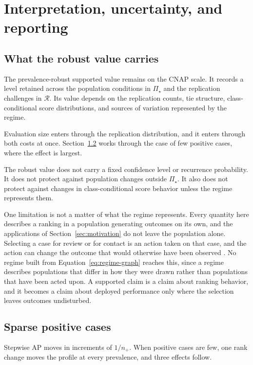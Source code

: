 \documentclass[11pt]{article}
\newcommand{\Regime}{\mathcal{R}}
\newcommand{\PSet}{\Pi_\star}
\theoremstyle{remark}
\begin{document}
\section{Interpretation, uncertainty, and reporting}
\label{sec:reporting}

\subsection{What the robust value carries}

The prevalence-robust supported value remains on the CNAP scale. It records a level retained across the population conditions in $\PSet$ and the replication challenges in $\Regime$. Its value depends on the replication counts, tie structure, class-conditional score distributions, and sources of variation represented by the regime.

Evaluation size enters through the replication distribution, and it enters through both costs at once. Section~\ref{sec:sparse} works through the case of few positive cases, where the effect is largest.

The robust value does not carry a fixed confidence level or recurrence probability. It does not protect against population changes outside $\PSet$. It also does not protect against changes in class-conditional score behavior unless the regime represents them.

One limitation is not a matter of what the regime represents. Every quantity here describes a ranking in a population generating outcomes on its own, and the applications of Section~\ref{sec:motivation} do not leave the population alone. Selecting a case for review or for contact is an action taken on that case, and the action can change the outcome that would otherwise have been observed \cite{perdomo2020performative}. No regime built from Equation~\eqref{eq:regime-graph} reaches this, since a regime describes populations that differ in how they were drawn rather than populations that have been acted upon. A supported claim is a claim about ranking behavior, and it becomes a claim about deployed performance only where the selection leaves outcomes undisturbed.

\subsection{Sparse positive cases}
\label{sec:sparse}

Stepwise AP moves in increments of $1/n_+$. When positive cases are few, one rank change moves the profile at every prevalence, and three effects follow.
\end{document}
